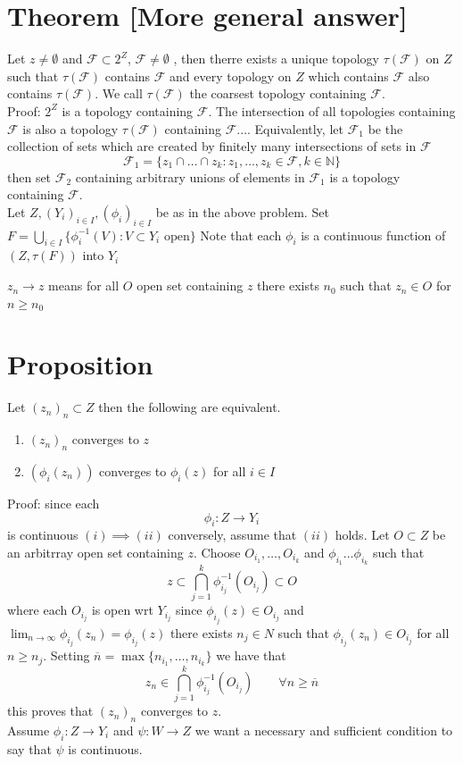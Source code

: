\documentclass[11pt]{article}
\begin{document}
\section{Theorem [More general answer]}
Let $z \ne \emptyset$ and  $ \mathcal{F} \subset 2^{Z}$, $ \mathcal{F} \ne \emptyset$ , then therre exists a unique topology $\tau( \mathcal{F})$ on $Z$ such that
$\tau( \mathcal{F})$ contains  $ \mathcal{F}$ and every topology on $Z$ which contains  $\mathcal{F}$ also contains  $\tau( \mathcal{F})$. 
We call $\tau( \mathcal{F})$ the coarsest topology containing $ \mathcal{F}$.\\
Proof: $2^{ Z}$ is a topology containing $ \mathcal{F}$. The intersection of all topologies containing $ \mathcal{F}$ is also a topology $\tau( \mathcal{F})$ containing $ \mathcal{F}$....
Equivalently, let $\mathcal{F}_1$ be the collection of sets which are created by finitely many intersections of sets in $ \mathcal{F}$
\[
    \mathcal{F}_1 = \{ z_1 \cap \dots \cap z_k : z_1,\dots,z_k \in \mathcal{F}, k \in \mathbb{N}\}
\] 
then set $ \mathcal{F}_2$ containing arbitrary unions of elements in $\mathcal{F}_1$ is a topology containing $ \mathcal{F}$.
\\
Let $Z, (Y_i)_{i \in I}, (\phi_i)_{i \in I}$ be as in the above problem. Set $F = \bigcup_{i \in I} \{\phi_i^{-1}(V) : V \subset Y_i \text{ open}\}$
Note that each $ \phi_i$ is a continuous function of $(Z , \tau( F))$ into $Y_i$

$z_n \rightarrow z$ means for all $O$ open set containing  $z$ there exists  $n_0$ such that  $z_n \in O$ for  $n \ge n_0$

\section{Proposition}
Let $(z_n)_n \subset Z$ then the following are equivalent.
\begin{enumerate}
    \item $(z_n)_n$ converges to  $z$
    \item  $(\phi_i(z_n)) $ converges to $\phi_i(z)$ for all $i \in I$
\end{enumerate}
Proof:  since each 
\[
\phi_i : Z \rightarrow Y_i
\] 
is continuous $(i) \implies (ii)$ conversely, assume that  $(ii)$ holds. Let  $O \subset Z$ be an arbitrray open set containing $z$. Choose  $O_{i_1}, \dots, O_{i_k}$ and
$\phi_{i_1} \dots \phi_{i_k}$ such that
\[
    z \subset \bigcap_{j = 1}^{k} \phi_{i_j}^{-1}(O_{i_j}) \subset O
\] 
where each $O_{i_j}$ is open wrt  $Y_{i_j}$ since  $\phi_{i_j}(z) \in O_{i_j}$ and $\lim_{n\to \infty} \phi_{i_j}(z_n) = \phi_{i_j}(z)$ there exists $n_j \in N$ such that
$\phi_{i_j}(z_n) \in O_{i_j}$ for all $n \ge n_j$. Setting  $\overline{n} = \max\{n_{i_1},\dots,n_{i_k}\}$ we have that
\[
    z_n \in \bigcap_{j=1}^{k}\phi_{i_j}^{-1}(O_{i_j}) \qquad \forall n \ge \overline{n}
\] 
this proves that $(z_n)_n$ converges to  $z$.\\
Assume $\phi_i : Z \rightarrow Y_i$ and $\psi : W \rightarrow Z$ we want a necessary and sufficient condition to say that $\psi$ is continuous.
\end{document}
